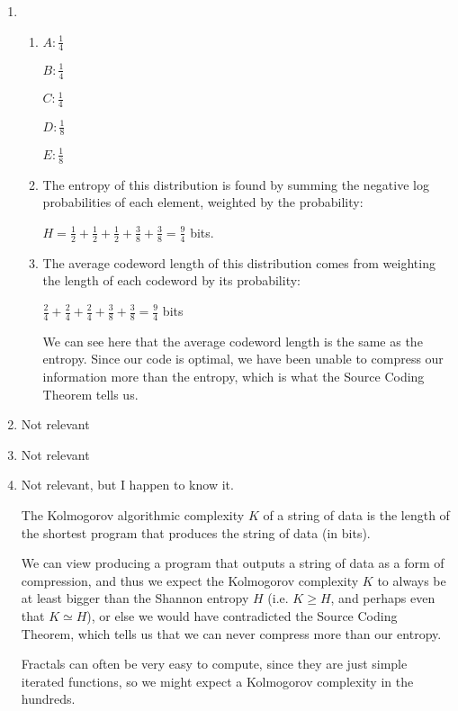 


\begin{enumerate}[label=(\alph*)]
  \item
    \begin{enumerate}[label=(\roman*)]
      \item
        $A: \frac{1}{4}$

        $B: \frac{1}{4}$

        $C: \frac{1}{4}$

        $D: \frac{1}{8}$

        $E: \frac{1}{8}$

      \item
        The entropy of this distribution is found by summing the negative log probabilities of each element, weighted by the probability:

        $H = \frac{1}{2} + \frac{1}{2} + \frac{1}{2} + \frac{3}{8} + \frac{3}{8}= \frac{9}{4}$ bits.

      \item
        The average codeword length of this distribution comes from weighting the length of each codeword by its probability:

        $\frac{2}{4} + \frac{2}{4} + \frac{2}{4} + \frac{3}{8} + \frac{3}{8} = \frac{9}{4}$ bits

        We can see here that the average codeword length is the same as the entropy. Since our code is optimal, we have been unable to compress our information more than the entropy, which is what the Source Coding Theorem tells us.
    \end{enumerate}

  \item
    Not relevant

  \item
    Not relevant

  \item
    Not relevant, but I happen to know it.

    The Kolmogorov algorithmic complexity $K$ of a string of data is the length of the shortest program that produces the string of data (in bits). 

    We can view producing a program that outputs a string of data as a form of compression, and thus we expect the Kolmogorov complexity $K$ to always be at least bigger than the Shannon entropy $H$ (i.e. $K \geq H$, and perhaps even that $K \simeq H$), or else we would have contradicted the Source Coding Theorem, which tells us that we can never compress more than our entropy.

    Fractals can often be very easy to compute, since they are just simple iterated functions, so we might expect a Kolmogorov complexity in the hundreds.


        
\end{enumerate}

